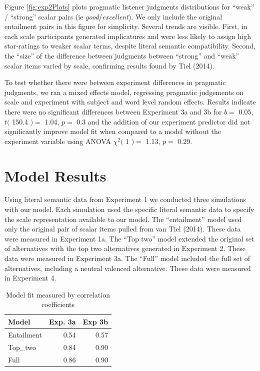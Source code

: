 \documentclass[10pt, letterpaper]{article}
\begin{document}
Figure \ref{fig:exp2Plots} plots pragmatic listener judgments
distributions for ``weak'' / ``strong'' scalar pairs (ie
\emph{good}/\emph{excellent}). We only include the original entailment
pairs in this figure for simplicity. Several trends are visible. First,
in each scale participants generated implicatures and were less likely
to assign high star-ratings to weaker scalar terms, despite literal
semantic compatibility. Second, the ``size'' of the difference between
judgments between ``strong'' and ``weak'' scalar items varied by scale,
confirming results found by Tiel (2014).

To test whether there were between experiment differences in pragmatic
judgments, we ran a mixed effects model, regressing pragmatic judgements
on scale and experiment with subject and word level random effects.
Results indicate there were no significant differences between
Experiment 3a and 3b for \(b =\) 0.05, \(t(\) 150.4 \() =\) 1.04,
\(p =\) 0.3 and the addition of our experiment predictor did not
significantly improve model fit when compared to a model without the
experiment variable using ANOVA \(\chi^2(\) 1 \() =\) 1.13, \(p =\)
0.29.

\section{Model Results}\label{model-results}

Using literal semantic data from Experiment 1 we conducted three
simulations with our model. Each simulation used the specific literal
semantic data to specify the scale representation available to our
model. The ``entailment'' model used only the original pair of scalar
items pulled from van Tiel (2014). These data were measured in
Experiment 1a. The ``Top two'' model extended the original set of
alternatives with the top two alternatives generated in Experiment 2.
These data were measured in Experiment 3a. The ``Full'' model included
the full set of alternatives, including a neutral valenced alternative.
These data were measured in Experiment 4.

\begin{table}[ht]
\centering
\begin{tabular}{lrr}
  \hline
Model & Exp. 3a & Exp 3b \\ 
  \hline
Entailment & 0.54 & 0.57 \\ 
  Top\_two & 0.84 & 0.90 \\ 
  Full & 0.86 & 0.90 \\ 
   \hline
\end{tabular}
\caption{Model fit measured by correlation coefficients} 
\end{table}
\end{document}
